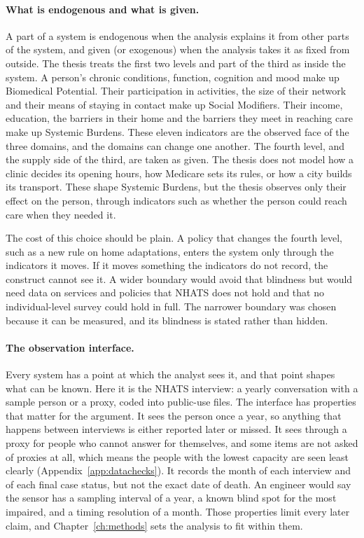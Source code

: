 \paragraph{What is endogenous and what is given.} A part of a system is
endogenous when the analysis explains it from other parts of the system, and
given (or exogenous) when the analysis takes it as fixed from outside. The
thesis treats the first two levels and part of the third as inside the
system. A person's chronic
conditions, function, cognition and mood make up Biomedical Potential. Their
participation in activities, the size of their network and their means of
staying in contact make up Social Modifiers. Their income, education, the
barriers in their home and the barriers they meet in reaching care make up
Systemic Burdens. These eleven indicators are the observed face of the three
domains, and the domains can change one another. The fourth level, and the
supply side of the third, are taken as given. The thesis does not model how a
clinic decides its opening hours, how Medicare sets its rules, or how a city
builds its transport. These shape Systemic Burdens, but the thesis observes
only their effect on the person, through indicators such as whether the person
could reach care when they needed it.

The cost of this choice should be plain. A policy that changes the fourth
level, such as a new rule on home adaptations, enters the system only through
the indicators it moves. If it moves something the indicators do not record,
the construct cannot see it. A wider boundary would avoid that blindness but
would need data on services and policies that NHATS does not hold and that no
individual-level survey could hold in full. The narrower boundary was chosen
because it can be measured, and its blindness is stated rather than hidden.

\paragraph{The observation interface.} Every system has a point at which the
analyst sees it, and that point shapes what can be known. Here it is the
NHATS interview: a yearly conversation with a sample person or a proxy,
coded into public-use files. The interface has properties that matter for the
argument. It sees the person once a year, so anything that happens between
interviews is either reported later or missed. It sees through a proxy for
people who cannot answer for themselves, and some items are not asked of
proxies at all, which means the people with the lowest capacity are seen
least clearly (Appendix~\ref{app:datachecks}). It records the month of each
interview and of each final case status, but not the exact date of death. An
engineer would say the sensor has a sampling interval of a year, a known blind
spot for the most impaired, and a timing resolution of a month. Those
properties limit every later claim, and Chapter~\ref{ch:methods} sets the
analysis to fit within them.

